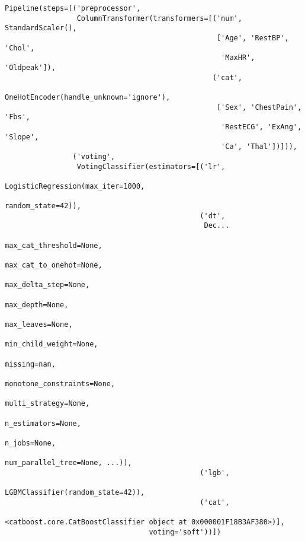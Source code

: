\documentclass[
  letterpaper,
  DIV=11,
  numbers=noendperiod]{scrreprt}
\begin{document}
\begin{verbatim}
Pipeline(steps=[('preprocessor',
                 ColumnTransformer(transformers=[('num', StandardScaler(),
                                                  ['Age', 'RestBP', 'Chol',
                                                   'MaxHR', 'Oldpeak']),
                                                 ('cat',
                                                  OneHotEncoder(handle_unknown='ignore'),
                                                  ['Sex', 'ChestPain', 'Fbs',
                                                   'RestECG', 'ExAng', 'Slope',
                                                   'Ca', 'Thal'])])),
                ('voting',
                 VotingClassifier(estimators=[('lr',
                                               LogisticRegression(max_iter=1000,
                                                                  random_state=42)),
                                              ('dt',
                                               Dec...
                                                             max_cat_threshold=None,
                                                             max_cat_to_onehot=None,
                                                             max_delta_step=None,
                                                             max_depth=None,
                                                             max_leaves=None,
                                                             min_child_weight=None,
                                                             missing=nan,
                                                             monotone_constraints=None,
                                                             multi_strategy=None,
                                                             n_estimators=None,
                                                             n_jobs=None,
                                                             num_parallel_tree=None, ...)),
                                              ('lgb',
                                               LGBMClassifier(random_state=42)),
                                              ('cat',
                                               <catboost.core.CatBoostClassifier object at 0x000001F18B3AF380>)],
                                  voting='soft'))])
\end{verbatim}
\end{document}
